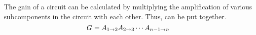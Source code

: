 The gain of a circuit can be calculated by multiplying the amplification of various subcomponents in the circuit with each other.
Thus,  can be put together.
\begin{equation}\label{eq:Gain-Broken}
  G_{} = A_{1 \to 2} A_{2 \to 3} \cdots A_{n-1 \to n}
\end{equation}


